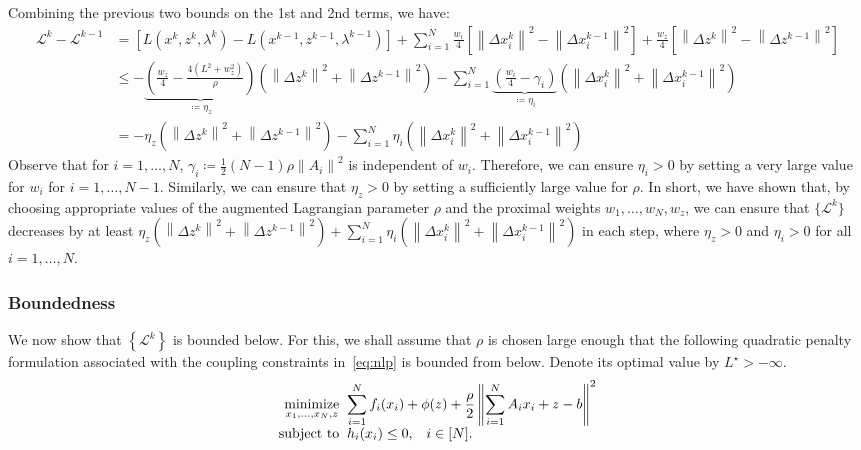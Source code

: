 \documentclass[11pt]{article}
\newcommand{\norm}[1]{\left\lVert #1 \right\rVert}
\begin{document}
Combining the previous two bounds on the 1st and 2nd terms, we have:
\begin{align*}
\mathcal{L}^k - \mathcal{L}^{k-1} &= \left[ L(x^k, z^k, \lambda^k) - L(x^{k-1}, z^{k-1}, \lambda^{k-1}) \right] + \sum_{i=1}^N \frac{w_i}{4} \left[\norm{\Delta x_i^k}^2 - \norm{\Delta x_i^{k-1}}^2 \right] + \frac{w_z}{4} \left[\norm{\Delta z^k}^2 - \norm{\Delta z^{k-1}}^2 \right] \\
&\leq -\underset{\coloneqq \eta_z}{\underbrace{\left(\frac{w_z}{4} - \frac{4(L^2 + w_z^2)}{\rho}\right)}}\left(\norm{\Delta z^k}^2 + \norm{\Delta z^{k-1}}^2\right) -\sum_{i=1}^N \underset{\coloneqq \eta_i}{\underbrace{\left(\frac{w_i}{4} - \gamma_i\right)}}\left(\norm{\Delta x_i^k}^2 + \norm{\Delta x_i^{k-1}}^2\right) \\
&= -\eta_z \left(\norm{\Delta z^k}^2 + \norm{\Delta z^{k-1}}^2\right) - \sum_{i=1}^N \eta_i\left(\norm{\Delta x_i^k}^2 + \norm{\Delta x_i^{k-1}}^2\right)
\end{align*}
Observe that for $i =1, \ldots, N$, $\gamma_i \coloneqq \frac12 (N-1)\rho\norm{A_i}^2$ is independent of $w_i$.
Therefore, we can ensure $\eta_i > 0$ by setting a very large value for $w_i$ for $i = 1, \ldots, N-1$.
Similarly, we can ensure that $\eta_z > 0$ by setting a sufficiently large value for $\rho$.
In short, we have shown that, by choosing appropriate values of the augmented Lagrangian parameter $\rho$ and the proximal weights $w_1, \ldots, w_N, w_z$, we can ensure that $\{\mathcal{L}^k\}$ decreases by at least $\eta_z\left(\norm{\Delta z^k}^2 + \norm{\Delta z^{k-1}}^2\right) + \sum_{i=1}^N \eta_i \left(\norm{\Delta x_i^k}^2 + \norm{\Delta x_i^{k-1}}^2\right)$ in each step, where $\eta_z > 0$ and $\eta_i > 0$ for all $i = 1, \ldots, N$.

\subsubsection{Boundedness}\label{sec:lyapunov_bounded}
We now show that $\left\{\mathcal{L}^k\right\}$ is bounded below.
For this, we shall assume that $\rho$ is chosen large enough that the following quadratic penalty formulation associated with the coupling constraints in~\eqref{eq:nlp} is bounded from below. Denote its optimal value by $L^\star > -\infty$.
    \[
    \begin{array}{r@{\;\;}l}
    \displaystyle\mathop{\text{minimize}}_{x_1, \ldots, x_N, z} & \displaystyle \sum_{i = 1}^N f_i(x_i) + \phi(z) + \frac{\rho}{2} \norm{\sum_{i=1}^N A_ix_i + z - b}^2  \\
    \text{subject to} & \displaystyle  h_i(x_i) \leq 0, \;\;\; i \in [N].
    \end{array}
    \]
\end{document}
